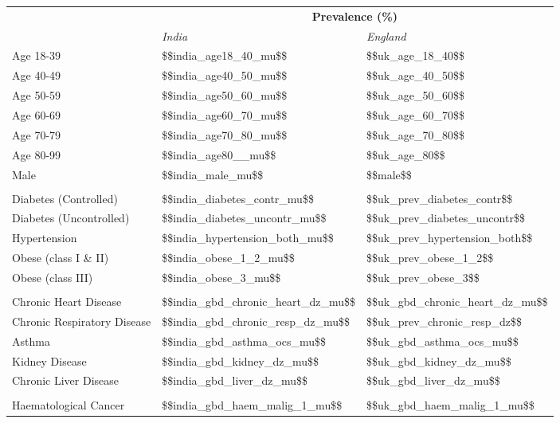 \begin{tabular}{p{7cm}p{1.1cm}p{1cm}}
& \multicolumn{2}{c}{\textbf{{\footnotesize Prevalence (\%) }}} \\[0.5ex] & \emph{India} & \emph{England} \\[2ex]
Age 18-39 & \num{$$india_age18_40_mu$$} & \num{$$uk_age_18_40$$} \\[0.25ex]
Age 40-49 & \num{$$india_age40_50_mu$$} & \num{$$uk_age_40_50$$} \\[0.25ex]
Age 50-59 & \num{$$india_age50_60_mu$$} & \num{$$uk_age_50_60$$}\\[0.25ex]
Age 60-69 & \num{$$india_age60_70_mu$$} & \num{$$uk_age_60_70$$}\\[0.25ex]
Age 70-79 & \num{$$india_age70_80_mu$$} & \num{$$uk_age_70_80$$}\\[0.25ex]
Age 80-99 & \num{$$india_age80__mu$$} & \num{$$uk_age_80$$} \\[0.25ex]
Male & \num{$$india_male_mu$$} & \num{$$male$$} \\[0.25ex]
\\
Diabetes (Controlled) & \num{$$india_diabetes_contr_mu$$} & \num{$$uk_prev_diabetes_contr$$} \\[0.25ex]
Diabetes (Uncontrolled) & \num{$$india_diabetes_uncontr_mu$$} & \num{$$uk_prev_diabetes_uncontr$$} \\[0.25ex]
Hypertension & \num{$$india_hypertension_both_mu$$} & \num{$$uk_prev_hypertension_both$$} \\[0.25ex]
Obese (class I \& II) & \num{$$india_obese_1_2_mu$$} & \num{$$uk_prev_obese_1_2$$} \\[0.25ex]
Obese (class III) & \num{$$india_obese_3_mu$$} & \num{$$uk_prev_obese_3$$} \\[0.25ex]
\\
Chronic Heart Disease & \num{$$india_gbd_chronic_heart_dz_mu$$} & \num{$$uk_gbd_chronic_heart_dz_mu$$} \\[0.25ex]
Chronic Respiratory Disease & \num{$$india_gbd_chronic_resp_dz_mu$$} & \num{$$uk_prev_chronic_resp_dz$$} \\[0.25ex]
Asthma & \num{$$india_gbd_asthma_ocs_mu$$} & \num{$$uk_gbd_asthma_ocs_mu$$} \\[0.25ex]
Kidney Disease & \num{$$india_gbd_kidney_dz_mu$$} & \num{$$uk_gbd_kidney_dz_mu$$} \\[0.25ex]
Chronic Liver Disease & \num{$$india_gbd_liver_dz_mu$$} & \num{$$uk_gbd_liver_dz_mu$$} \\[0.25ex]
\\
Haematological Cancer & \num{$$india_gbd_haem_malig_1_mu$$} & \num{$$uk_gbd_haem_malig_1_mu$$}\\[0.25ex]

\end{tabular}
